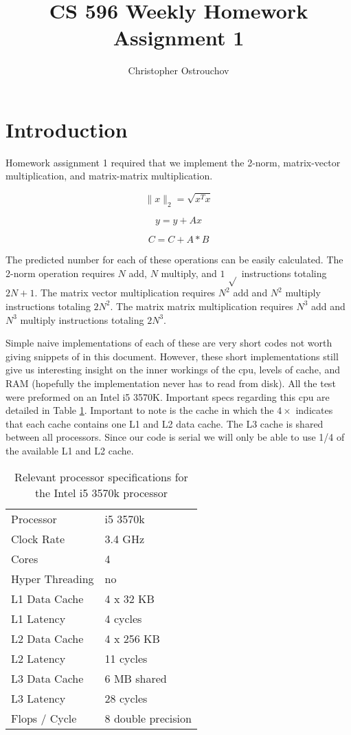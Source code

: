 \documentclass[a4paper,12pt]{article}
\begin{document}
\title{CS 596 Weekly Homework Assignment 1}
\author{Christopher Ostrouchov}
\date{}

\maketitle

\section{Introduction}
Homework assignment 1 required that we implement the 2-norm, matrix-vector multiplication, and matrix-matrix multiplication. 

\[ \| x \|_{2} = \sqrt{x^{T}x} \]

\[y = y + A x \]

\[C = C + A * B \] 

The predicted number for each of these operations can be easily calculated. The 2-norm operation requires $N$ add, $N$ multiply, and $1$ $\sqrt{ }$ instructions totaling $2N + 1$. The matrix vector multiplication requires $N^{2}$ add and $N^{2}$ multiply instructions totaling $2N^{2}$. The matrix matrix multiplication requires $N^{3}$ add and $N^{3}$ multiply instructions totaling $2N^{3}$.

Simple naive implementations of each of these are very short codes not worth giving snippets of in this document. However, these short implementations still give us interesting insight on the inner workings of the cpu, levels of cache, and RAM (hopefully the implementation never has to read from disk). All the test were preformed on an Intel i5 3570K. Important specs regarding this cpu are detailed in Table \ref{tab:i5_3570k}. Important to note is the cache in which the $4 \times$ indicates that each cache contains one L1 and L2 data cache. The L3 cache is shared between all processors. Since our code is serial we will only be able to use 1/4 of the available L1 and L2 cache. 

\begin{table}[!ht]
  \centering
  \caption{Relevant processor specifications for the Intel i5 3570k processor}
  \label{tab:i5_3570k}

  \vspace{3mm}
  \begin{tabular}{ l | l } 
    Processor & i5 3570k \\
    Clock Rate & 3.4 GHz \\
    Cores & 4 \\
    Hyper Threading & no \\
    L1 Data Cache & 4 x 32 KB \\
    L1 Latency & 4 cycles \\
    L2 Data Cache & 4 x 256 KB \\
    L2 Latency & 11 cycles \\
    L3 Data Cache & 6 MB shared \\
    L3 Latency & 28 cycles \\
    Flops / Cycle & 8 double precision
  \end{tabular}
\end{table}
\end{document}

